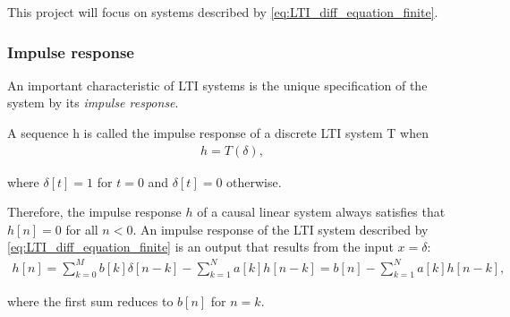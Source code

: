 This project will focus on systems described by \eqref{eq:LTI_diff_equation_finite}.

\subsubsection{Impulse response}
An important characteristic of LTI systems is the unique specification of the system by its \textit{impulse response}.
\begin{definition}\label{def:impulse_response}
A sequence h is called the impulse response of a discrete LTI system T when
\begin{align}
h=T(\delta),
\end{align}

where $\delta[t] = 1$ for $t = 0$ and $\delta[t] = 0$ otherwise.
\end{definition}

Therefore, the impulse response $h$ of a causal linear system always satisfies that $h[n] = 0$ for all $n < 0$. An impulse response of the LTI system described by \eqref{eq:LTI_diff_equation_finite} is an output that results from the input $x = \delta$:
\begin{align*}
h[n] = \sum_{k=0}^M b[k] \delta[n-k] - \sum_{k=1}^N a[k] h[n-k] = b[n] - \sum_{k=1}^N a[k] h[n-k],
\end{align*}

where the first sum reduces to $b[n]$ for $n = k$.
